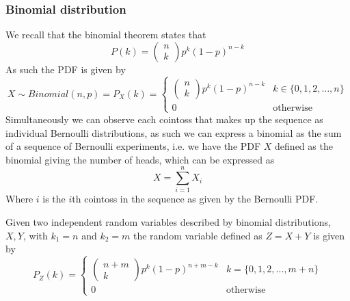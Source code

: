 \subsubsection{Binomial distribution}
We recall that the binomial theorem states that
\[
    P(k)=\begin{pmatrix}n\\k\end{pmatrix}p^{k}(1-p)^{n-k}
\]
As such the PDF is given by
\[
    X\sim Binomial(n,p)=P_{X}(k)=\begin{cases}\begin{pmatrix}n\\k\end{pmatrix}p^{k}(1-p)^{n-k} & k\in\{0,1,2,\ldots,n\} \\ 0 & \text{otherwise}\end{cases}
\]
Simultaneously we can observe each cointoss that makes up the sequence as individual Bernoulli distributions, as such we can express a binomial as the sum of a sequence of Bernoulli experiments, i.e. we have the PDF $X$ defined as the binomial giving the number of heads, which can be expressed as
\[
    X=\sum_{i=1}^{n}X_{i}
\]
Where $i$ is the $i$th cointoss in the sequence as given by the Bernoulli PDF.
\begin{theorem}
    Given two independent random variables described by binomial distributions, $X,Y$, with $k_{1}=n$ and $k_{2}=m$ the random variable defined as $Z=X+Y$ is given by
    \[
        P_{Z}(k)=\begin{cases}\begin{pmatrix}n+m\\k\end{pmatrix}p^{k}(1-p)^{n+m-k} & k=\{0,1,2,\ldots,m+n\} \\ 0 & \text{otherwise}\end{cases}
    \]
\end{theorem}
